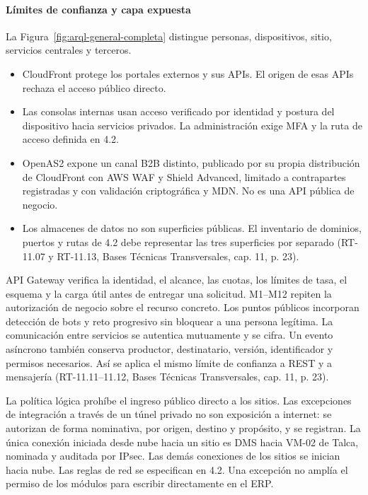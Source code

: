 \paragraph{Límites de confianza y capa expuesta}
La Figura~\ref{fig:arql-general-completa} distingue personas, dispositivos, sitio, servicios centrales y terceros.

\begin{itemize}
  \item CloudFront protege los portales externos y sus APIs. El origen de esas APIs rechaza el acceso público directo.
  \item Las consolas internas usan acceso verificado por identidad y postura del dispositivo hacia servicios privados. La administración exige MFA y la ruta de acceso definida en 4.2.
  \item OpenAS2 expone un canal B2B distinto, publicado por su propia distribución de CloudFront con AWS WAF y Shield Advanced, limitado a contrapartes registradas y con validación criptográfica y MDN. No es una API pública de negocio.
  \item Los almacenes de datos no son superficies públicas. El inventario de dominios, puertos y rutas de 4.2 debe representar las tres superficies por separado (RT-11.07 y RT-11.13, Bases Técnicas Transversales, cap. 11, p. 23).
\end{itemize}

API Gateway verifica la identidad, el alcance, las cuotas, los límites de tasa, el esquema y la carga útil antes de entregar una solicitud. M1--M12 repiten la autorización de negocio sobre el recurso concreto. Los puntos públicos incorporan detección de bots y reto progresivo sin bloquear a una persona legítima. La comunicación entre servicios se autentica mutuamente y se cifra. Un evento asíncrono también conserva productor, destinatario, versión, identificador y permisos necesarios. Así se aplica el mismo límite de confianza a REST y a mensajería (RT-11.11--11.12, Bases Técnicas Transversales, cap. 11, p. 23).

La política lógica prohíbe el ingreso público directo a los sitios. Las excepciones de integración a través de un túnel privado no son exposición a internet: se autorizan de forma nominativa, por origen, destino y propósito, y se registran. La única conexión iniciada desde nube hacia un sitio es DMS hacia VM-02 de Talca, nominada y auditada por IPsec. Las demás conexiones de los sitios se inician hacia nube. Las reglas de red se especifican en 4.2. Una excepción no amplía el permiso de los módulos para escribir directamente en el ERP.


